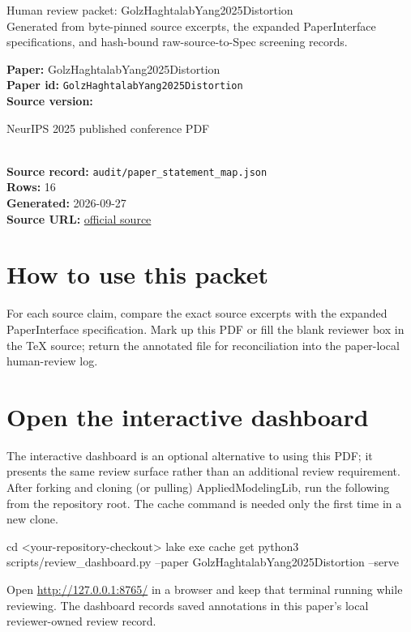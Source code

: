 \documentclass[10pt]{article}
\begin{document}
\fontsize{9}{10}\selectfont

\begin{center}
{\LARGE Human review packet: GolzHaghtalabYang2025Distortion}\\[0.35em]
\small Generated from byte-pinned source excerpts, the expanded PaperInterface
specifications, and hash-bound raw-source-to-Spec screening records.
\end{center}

\noindent\textbf{Paper:} GolzHaghtalabYang2025Distortion\\
\textbf{Paper id:} \texttt{GolzHaghtalabYang2025Distortion}\\
\textbf{Source version:} \parbox[t]{0.76\linewidth}{\raggedright NeurIPS 2025 published conference PDF}\\
\textbf{Source record:} \texttt{audit/paper\_statement\_map.json}\\
\textbf{Rows:} 16\\
\textbf{Generated:} 2026-09-27\\
\textbf{Source URL:} \href{https://arxiv.org/abs/2505.23749}{official source}





\section*{How to use this packet}
For each source claim, compare the exact source excerpts with the expanded
PaperInterface specification. Mark up this PDF or fill the blank reviewer box in the TeX source;
return the annotated file for reconciliation into the paper-local human-review
log.

\section*{Open the interactive dashboard}
The interactive dashboard is an optional alternative to using this PDF; it
presents the same review surface rather than an additional review requirement.
After forking and cloning (or pulling) AppliedModelingLib, run the following from the
repository root. The cache command is needed only the first time in a new clone.
\begin{ReviewVerbatim}
cd <your-repository-checkout>
lake exe cache get
python3 scripts/review_dashboard.py --paper GolzHaghtalabYang2025Distortion --serve
\end{ReviewVerbatim}
Open \url{http://127.0.0.1:8765/} in a browser and keep that terminal running
while reviewing. The dashboard records saved annotations in this paper's local
reviewer-owned review record.
\end{document}

